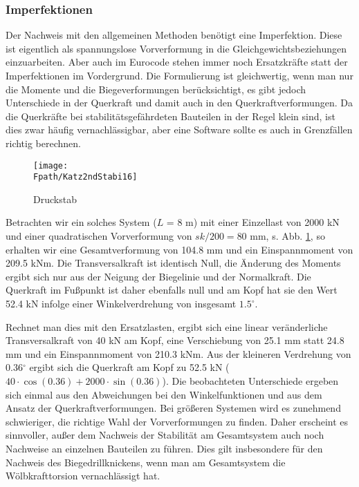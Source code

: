 {\textcolor{sectionTitleBlue}{\subsubsection*{Imperfektionen }}}

Der Nachweis mit den allgemeinen Methoden ben\"{o}tigt eine Imperfektion. Diese ist eigentlich als spannungslose Vorverformung in die Gleichgewichtsbeziehungen einzuarbeiten. Aber auch im Eurocode stehen immer noch Ersatzkr\"{a}fte statt der Imperfektionen im Vordergrund.  Die Formulierung ist gleichwertig, wenn man nur die Momente und die Biegeverformungen ber\"{u}cksichtigt, es gibt jedoch Unterschiede in der Querkraft und damit auch in den Querkraftverformungen. Da die Querkr\"{a}fte bei stabilit\"{a}tsgef\"{a}hrdeten Bauteilen in der Regel klein sind, ist dies zwar h\"{a}ufig vernachl\"{a}ssigbar, aber eine Software sollte es auch in Grenzf\"{a}llen richtig berechnen.


\begin{figure}[tbp] \centering
\centering
\if {} \sidecaption[t] \fi
\texttt{[image: \\Fpath/Katz2ndStabi16]}
\caption{Druckstab} \label{Katz2ndStabi16}
\end{figure}%

Betrachten wir ein solches System ($L$ = 8 m) mit einer Einzellast von 2000 kN und einer quadratischen Vorverformung von $sk/200 = 80$ mm, s. Abb. \ref{Katz2ndStabi16}, so erhalten wir eine Gesamtverformung von 104.8 mm und ein Einspannmoment von 209.5 kNm. Die Transversalkraft ist identisch Null, die \"{A}nderung des Moments ergibt sich nur aus der Neigung der Biegelinie und der Normalkraft. Die Querkraft im Fu{\ss}punkt ist daher ebenfalls null und am Kopf hat sie den Wert 52.4 kN infolge einer Winkelverdrehung von insgesamt $1.5^\circ$.

Rechnet man dies mit den Ersatzlasten, ergibt sich eine linear ver\"{a}nderliche Transversalkraft von 40 kN am Kopf, eine Verschiebung von 25.1 mm statt 24.8 mm und ein Einspannmoment von 210.3 kNm. Aus der kleineren Verdrehung von 0.36$^\circ$ ergibt sich die Querkraft am Kopf zu 52.5 kN ($40\cdot \cos(0.36)+2000\cdot \sin(0.36)$). Die beobachteten Unterschiede ergeben sich einmal aus den Abweichungen bei den Winkelfunktionen und aus dem Ansatz der Querkraftverformungen.
Bei gr\"{o}{\ss}eren Systemen wird es zunehmend schwieriger, die richtige Wahl der Vorverformungen zu finden. Daher erscheint es sinnvoller, au{\ss}er dem Nachweis der Stabilit\"{a}t am Gesamtsystem auch noch Nachweise an einzelnen Bauteilen zu f\"{u}hren. Dies gilt insbesondere f\"{u}r den Nachweis des Biegedrillknickens, wenn man am Gesamtsystem die W\"{o}lbkrafttorsion vernachl\"{a}ssigt hat.

